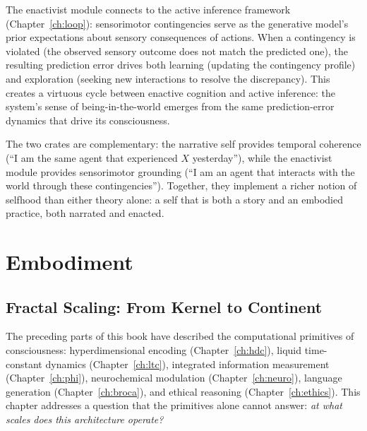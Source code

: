 \documentclass[12pt]{book}
\begin{document}
The enactivist module connects to the active inference framework (Chapter~\ref{ch:loop}): sensorimotor contingencies serve as the generative model's prior expectations about sensory consequences of actions. When a contingency is violated (the observed sensory outcome does not match the predicted one), the resulting prediction error drives both learning (updating the contingency profile) and exploration (seeking new interactions to resolve the discrepancy). This creates a virtuous cycle between enactive cognition and active inference: the system's sense of being-in-the-world emerges from the same prediction-error dynamics that drive its consciousness.

The two crates are complementary: the narrative self provides temporal coherence (``I am the same agent that experienced $X$ yesterday''), while the enactivist module provides sensorimotor grounding (``I am an agent that interacts with the world through these contingencies''). Together, they implement a richer notion of selfhood than either theory alone: a self that is both a story and an embodied practice, both narrated and enacted.



\part{Embodiment}

\chapter{Fractal Scaling: From Kernel to Continent}
\label{ch:fractal}

The preceding parts of this book have described the computational primitives of consciousness: hyperdimensional encoding (Chapter~\ref{ch:hdc}), liquid time-constant dynamics (Chapter~\ref{ch:ltc}), integrated information measurement (Chapter~\ref{ch:phi}), neurochemical modulation (Chapter~\ref{ch:neuro}), language generation (Chapter~\ref{ch:broca}), and ethical reasoning (Chapter~\ref{ch:ethics}). This chapter addresses a question that the primitives alone cannot answer: \textit{at what scales does this architecture operate?}
\end{document}
